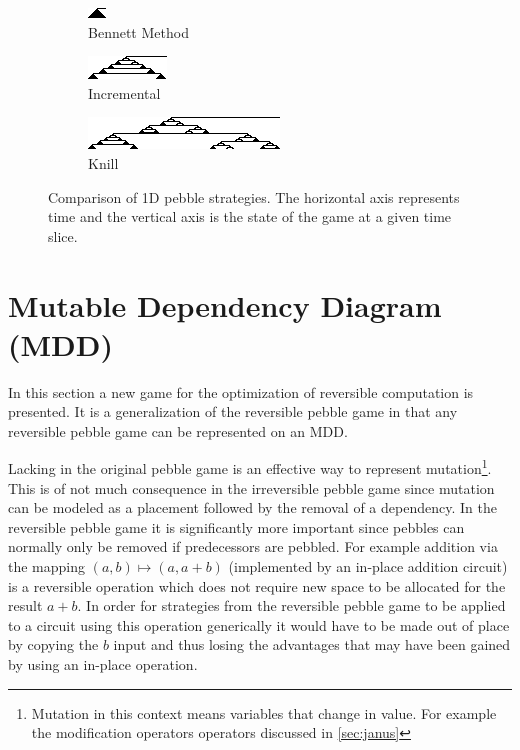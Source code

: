\begin{figure}
  \centering
  \begin{subfigure}{0.3\textwidth}
    \centering
    \includegraphics{images/Pebble1.png}
    \caption{Bennett Method}
  \end{subfigure}
  \begin{subfigure}{0.3\textwidth}
    \centering
    \includegraphics{images/Pebble2.png}
    \caption{Incremental}
  \end{subfigure}\begin{subfigure}{0.3\textwidth}
    \centering
    \includegraphics{images/Pebble3.png}
    \caption{Knill}
  \end{subfigure}
  \caption{Comparison of 1D pebble strategies. The horizontal axis represents
  time and the vertical axis is the state of the game at a given time slice.}
  \label{fig:pebble}
\end{figure}

\section{Mutable Dependency Diagram (MDD)\cite{parent15}}


In this section a new game for the optimization of reversible computation is
presented. It is a generalization of the reversible pebble game in that any
reversible pebble game can be represented on an MDD.

Lacking in the original pebble game is an effective way to represent
mutation\footnote{Mutation in this context means variables that change in
value. For example the modification operators operators discussed in
\cref{sec:janus}}. This is of not much consequence in the irreversible pebble
game since mutation can be modeled as a placement followed by the removal of a
dependency. In the reversible pebble game it is significantly more important
since pebbles can normally only be removed if predecessors are pebbled. For
example addition via the mapping $(a,b) \mapsto (a,a+b)$ (implemented by an
in-place addition circuit) is a reversible operation which does not require new
space to be allocated for the result $a+b$.  In order for strategies from the
reversible pebble game to be applied to a circuit using this operation
generically it would have to be made out of place by copying the $b$ input and
thus losing the advantages that may have been gained by using an in-place
operation.

